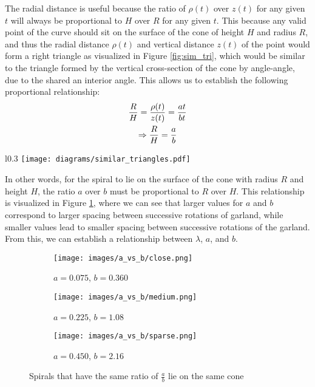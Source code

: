 The radial distance is useful because the ratio of $\rho(t)$ over $z(t)$ for any given $t$ will always be proportional to $H$ over $R$ for any given $t$. This because any valid point of the curve should sit on the surface of the cone of height $H$ and radius $R$, and thus the radial distance $\rho(t)$ and vertical distance $z(t)$ of the point would form a right triangle as visualized in Figure \ref{fig:sim_tri}, which would be similar to the triangle formed by the vertical cross-section of the cone by angle-angle, due to the shared an interior angle. This allows us to establish the following proportional relationship:
\begin{gather}
    \frac{R}{H} = \frac{\rho(t)}{z(t)} = \frac{at}{bt} \notag \\
    \Rightarrow \frac{R}{H} = \frac{a}{b} \label{eq:proportion}
\end{gather}

\begin{wrapfigure}[7]{l}{0.3\textwidth}
    \texttt{[image: diagrams/similar\_triangles.pdf]}
    \caption{Similar Triangles.} \label{fig:sim_tri}
\end{wrapfigure}
In other words, for the spiral to lie on the surface of the cone with radius $R$ and height $H$, the ratio $a$ over $b$ must be proportional to $R$ over $H$. This relationship is visualized in Figure \ref{fig:param_comparison}, where we can see that larger values for $a$ and $b$ correspond to larger spacing between successive rotations of garland, while smaller values lead to smaller spacing between successive rotations of the garland. From this, we can establish a relationship between $\lambda$, $a$, and $b$.

\begin{figure}[H]
    \centering
    \begin{subfigure}[t]{0.32\textwidth}
        \centering
        \texttt{[image: images/a\_vs\_b/close.png]}
        \caption{$a=0.075$, $b=0.360$}
    \end{subfigure}
    \begin{subfigure}[t]{0.32\textwidth}
        \centering
        \texttt{[image: images/a\_vs\_b/medium.png]}
        \caption{$a=0.225$, $b=1.08$}
    \end{subfigure}
    \begin{subfigure}[t]{0.32\textwidth}
        \centering
        \texttt{[image: images/a\_vs\_b/sparse.png]}
        \caption{$a=0.450$, $b=2.16$}
    \end{subfigure}
    \caption{Spirals that have the same ratio of $\frac{a}{b}$ lie on the same cone} \label{fig:param_comparison}
\end{figure}

